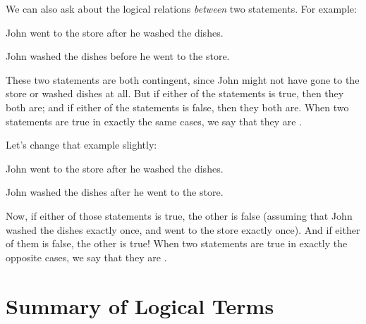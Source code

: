 \documentclass[PHIL101-Textbook.tex]{subfiles}
\begin{document}


We can also ask about the logical relations \emph{between} two statements. For example:
\begin{earg}
\item[] John went to the store after he washed the dishes.
\item[] John washed the dishes before he went to the store.
\end{earg}
These two statements are both contingent, since John might not have gone to the store or washed dishes at all. But if either of the statements is true, then they both are; and if either of the statements is false, then they both are. When two statements are true in exactly the same cases, we say that they are .


Let's change that example slightly:
\begin{earg}
\item[] John went to the store after he washed the dishes.
\item[] John washed the dishes after he went to the store.
\end{earg}
Now, if either of those statements is true, the other is false (assuming that John washed the dishes exactly once, and went to the store exactly once). And if either of them is false, the other is true! When two statements are true in exactly the opposite cases, we say that they are .



\section*{Summary of Logical Terms}
\end{document}
